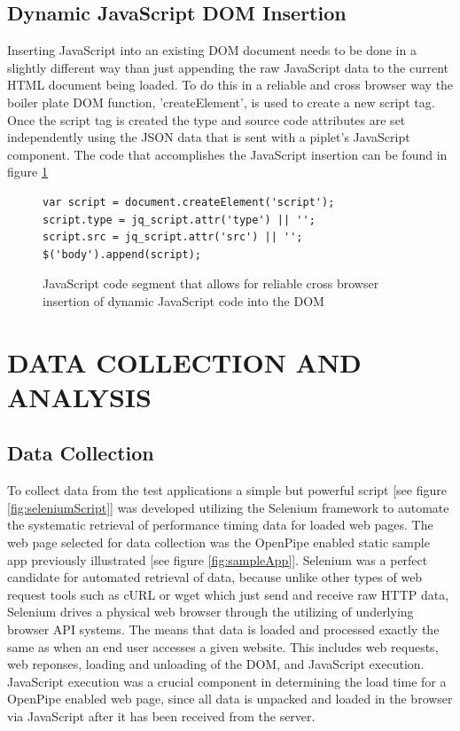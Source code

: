 \documentclass[12pt]{report}
\begin{document}
\section{Dynamic JavaScript DOM Insertion}
Inserting JavaScript into an existing DOM document needs to be done in a slightly different way than just appending the raw JavaScript data to the current HTML document being loaded. To do this in a reliable and cross browser way the boiler plate DOM function, 'createElement', is used to create a new script tag. Once the script tag is created the type and source code attributes are set independently using the JSON data that is sent with a piplet's JavaScript component. The code that accomplishes the JavaScript insertion can be found in figure \ref{fig:javascriptInsertion}

\begin{figure}[H]
\label{fig:javascriptInsertion}
\begin{lstlisting}
var script = document.createElement('script');
script.type = jq_script.attr('type') || '';
script.src = jq_script.attr('src') || '';
$('body').append(script);
\end{lstlisting}
\caption{JavaScript code segment that allows for reliable cross browser insertion of dynamic JavaScript code into the DOM}
\end{figure}

\chapter{DATA COLLECTION AND ANALYSIS}

\section{Data Collection}
To collect data from the test applications a simple but powerful script [see figure \ref{fig:seleniumScript}] was developed utilizing the Selenium framework to automate the systematic retrieval of performance timing data for loaded web pages. The web page selected for data collection was the OpenPipe enabled static sample app previously illustrated [see figure \ref{fig:sampleApp}].  Selenium was a perfect candidate for automated retrieval of data, because unlike other types of web request tools such as cURL or wget which just send and receive raw HTTP data, Selenium drives a physical web browser through the utilizing of underlying browser API systems. The means that data is loaded and processed exactly the same as when an end user accesses a given website. This includes web requests, web reponses,  loading and unloading of the DOM,  and JavaScript execution. JavaScript execution was a crucial component in determining the load time for a OpenPipe enabled web page, since all data is unpacked and loaded in the browser via JavaScript after it has been received from the server.
\end{document}
